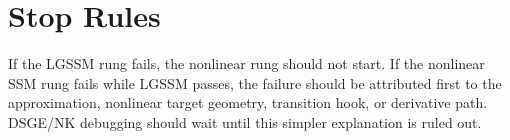 \section{Stop Rules}
\label{sec:bf-nonlinear-stop-rules}

If the LGSSM rung fails, the nonlinear rung should not start.  If the nonlinear
SSM rung fails while LGSSM passes, the failure should be attributed first to
the approximation, nonlinear target geometry, transition hook, or derivative
path.  DSGE/NK debugging should wait until this simpler explanation is ruled
out.
